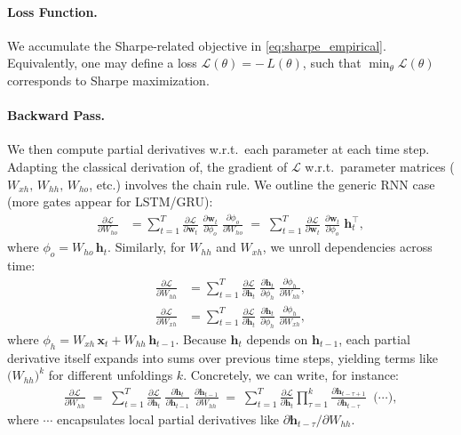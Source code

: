 \documentclass[11pt]{article}
\begin{document}
\paragraph{Loss Function.}
We accumulate the Sharpe-related objective in \eqref{eq:sharpe_empirical}. Equivalently, one may define a loss \(\mathcal{L}(\theta) = -\,L(\theta)\), such that \(\min_\theta \mathcal{L}(\theta)\) corresponds to Sharpe maximization.

\paragraph{Backward Pass.}
We then compute partial derivatives w.r.t.\ each parameter at each time step.  Adapting the classical derivation of, the gradient of \(\mathcal{L}\) w.r.t.\ parameter matrices (\(W_{xh},\,W_{hh},\,W_{ho}\), etc.) involves the chain rule. We outline the generic RNN case (more gates appear for LSTM/GRU):
\begin{align}
    \frac{\partial \mathcal{L}}{\partial W_{ho}} 
    &= \sum_{t=1}^T 
    \frac{\partial \mathcal{L}}{\partial \mathbf{w}_t}
    \;\frac{\partial \mathbf{w}_t}{\partial \phi_o}
    \;\frac{\partial \phi_o}{\partial W_{ho}}
    \;=\;
    \sum_{t=1}^T 
    \frac{\partial \mathcal{L}}{\partial \mathbf{w}_t}
    \;\frac{\partial \mathbf{w}_t}{\partial \phi_o}
    \;\mathbf{h}_t^\top,
    \label{eq:W_ho_grad}
\end{align}
where \(\phi_o = W_{ho}\,\mathbf{h}_t\). Similarly, for \(W_{hh}\) and \(W_{xh}\), we unroll dependencies across time:
\begin{align}
    \frac{\partial \mathcal{L}}{\partial W_{hh}} 
    &= \sum_{t=1}^T 
    \frac{\partial \mathcal{L}}{\partial \mathbf{h}_t}
    \;\frac{\partial \mathbf{h}_t}{\partial \phi_h}
    \;\frac{\partial \phi_h}{\partial W_{hh}},
    \label{eq:W_hh_grad}\\
    \frac{\partial \mathcal{L}}{\partial W_{xh}} 
    &= \sum_{t=1}^T 
    \frac{\partial \mathcal{L}}{\partial \mathbf{h}_t}
    \;\frac{\partial \mathbf{h}_t}{\partial \phi_h}
    \;\frac{\partial \phi_h}{\partial W_{xh}},
\end{align}
where \(\phi_h = W_{xh}\,\mathbf{x}_t + W_{hh}\,\mathbf{h}_{t-1}\). Because \(\mathbf{h}_t\) depends on \(\mathbf{h}_{t-1}\), each partial derivative itself expands into sums over previous time steps, yielding terms like 
\(\bigl(W_{hh}\bigr)^k\) for different unfoldings \(k\). Concretely, we can write, for instance:
\begin{align}
    \frac{\partial \mathcal{L}}{\partial W_{hh}}
    \;=\;
    \sum_{t=1}^T
    \frac{\partial \mathcal{L}}{\partial \mathbf{h}_t}
    \;\frac{\partial \mathbf{h}_t}{\partial \mathbf{h}_{t-1}}
    \;\frac{\partial \mathbf{h}_{t-1}}{\partial W_{hh}}
    \;=\;
    \sum_{t=1}^T
    \frac{\partial \mathcal{L}}{\partial \mathbf{h}_t}
    \prod_{\tau=1}^k
    \frac{\partial \mathbf{h}_{t-\tau+1}}{\partial \mathbf{h}_{t-\tau}}
    \;\;\bigl(\cdots\bigr),
\end{align}
where \(\cdots\) encapsulates local partial derivatives like \(\partial \mathbf{h}_{t-\tau} / \partial W_{hh}\).  
\end{document}
